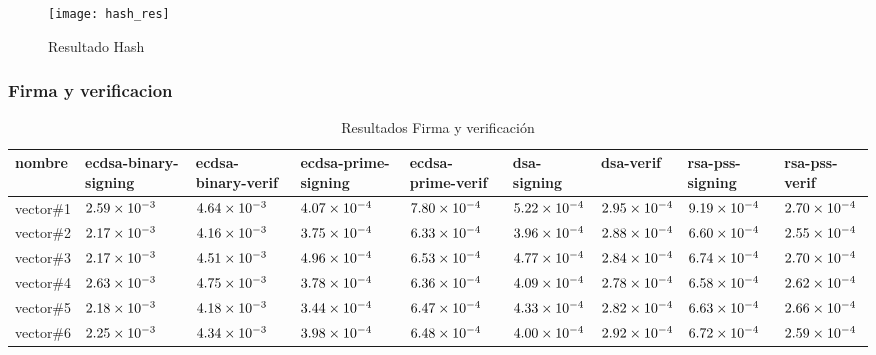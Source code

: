 \documentclass[../main.tex]{subfiles}
\begin{document}
\begin{figure}
  \centering
  \texttt{[image: hash\_res]}
  \caption{Resultado Hash}\label{fig:hash}
\end{figure}


\subsubsection{Firma y verificacion}\label{sec:firma-y-verificacion}
\begin{table*}[]
  \scriptsize
  \centering
  \caption{Resultados Firma y verificación}\label{tab:hash-res}
  \begin{tabular}{|m{1.5cm}<{\centering}|m{1.3cm}<{\centering}|m{1.3cm}<{\centering}|m{1.3cm}<{\centering}|m{1.3cm}<{\centering}|m{1.3cm}<{\centering}|m{1.3cm}<{\centering}|m{1.3cm}<{\centering}|m{1.3cm}<{\centering}|}
    \hline
    \rowcolor[HTML]{000000}
    {\color[HTML]{FFFFFF} nombre} &
  {\color[HTML]{FFFFFF} ecdsa-binary-signing} &
  {\color[HTML]{FFFFFF} ecdsa-binary-verif} &
  {\color[HTML]{FFFFFF} ecdsa-prime-signing} &
  {\color[HTML]{FFFFFF} ecdsa-prime-verif} &
  {\color[HTML]{FFFFFF} dsa-signing} &
  {\color[HTML]{FFFFFF} dsa-verif} &
  {\color[HTML]{FFFFFF} rsa-pss-signing} &
  {\color[HTML]{FFFFFF} rsa-pss-verif} \\ \hline
    vector\#1  & $\num{2.59E-03}$ & $\num{4.64E-03}$ & $\num{4.07E-04}$ & $\num{7.80E-04}$ & $\num{5.22E-04}$ & $\num{2.95E-04}$ & $\num{9.19E-04}$ & $\num{2.70E-04}$ \\ \hline
    \rowcolor[HTML]{C0C0C0}
    vector\#2 & $\num{2.17E-03}$ & $\num{4.16E-03}$ & $\num{3.75E-04}$ & $\num{6.33E-04}$ & $\num{3.96E-04}$ & $\num{2.88E-04}$ & $\num{6.60E-04}$ & $\num{2.55E-04}$ \\ \hline
    vector\#3 & $\num{2.17E-03}$ & $\num{4.51E-03}$ & $\num{4.96E-04}$ & $\num{6.53E-04}$ & $\num{4.77E-04}$ & $\num{2.84E-04}$ & $\num{6.74E-04}$ & $\num{2.70E-04}$ \\ \hline
    \rowcolor[HTML]{C0C0C0}
    vector\#4 & $\num{2.63E-03}$ & $\num{4.75E-03}$ & $\num{3.78E-04}$ & $\num{6.36E-04}$ & $\num{4.09E-04}$ & $\num{2.78E-04}$ & $\num{6.58E-04}$ & $\num{2.62E-04}$ \\ \hline
    vector\#5  & $\num{2.18E-03}$ & $\num{4.18E-03}$ & $\num{3.44E-04}$ & $\num{6.47E-04}$ & $\num{4.33E-04}$ & $\num{2.82E-04}$ & $\num{6.63E-04}$ & $\num{2.66E-04}$ \\ \hline
    \rowcolor[HTML]{C0C0C0}
    vector\#6  & $\num{2.25E-03}$ & $\num{4.34E-03}$ & $\num{3.98E-04}$ & $\num{6.48E-04}$ & $\num{4.00E-04}$ & $\num{2.92E-04}$ & $\num{6.72E-04}$ & $\num{2.59E-04}$ \\ \hline

\end{tabular}
\end{table*}
\end{document}

